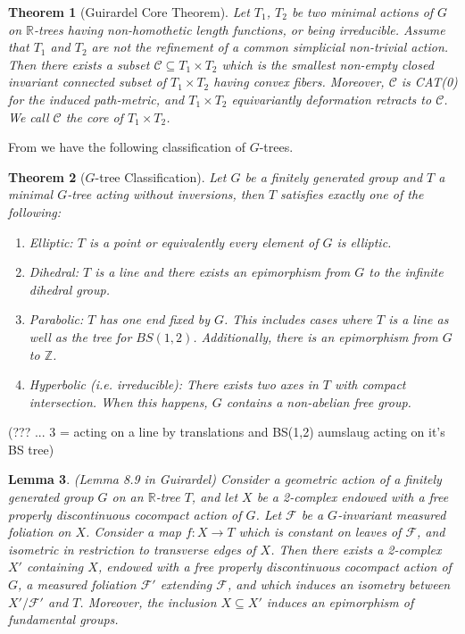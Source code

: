 \documentclass[12pt,parskip=full]{report}
\theoremstyle{plain}
\newtheorem{thm}{Theorem}[section]
\newtheorem{lem}[thm]{Lemma}
\theoremstyle{definition}
\begin{document}
\begin{thm}
    [Guirardel Core Theorem]
    \label{thm:guirardelcore}
    Let \(T_1\), \(T_2\) be two minimal actions of \(G\) on \(\mathbb{R}\)-trees having non-homothetic length functions, or being irreducible. Assume that \(T_1\) and \(T_2\) are not the refinement of a common simplicial non-trivial action. Then there exists a subset \(\mathscr{C}\subseteq T_1\times T_2\) which is the smallest non-empty closed invariant connected subset of \(T_1\times T_2\) having convex fibers. Moreover, \(\mathscr{C}\) is CAT(0) for the induced path-metric, and \(T_1\times T_2\) equivariantly deformation retracts to \(\mathscr{C}\). We call \(\mathscr{C}\) the core of \(T_1\times T_2\).
\end{thm}

From \cite{boundingcomplexity} we have the following classification of \(G\)-trees.
\begin{thm}
    [\(G\)-tree Classification]
    \label{thm:classification}
    Let \(G\) be a finitely generated group and \(T\) a minimal \(G\)-tree acting without inversions, then \(T\) satisfies exactly one of the following:
    
    \begin{enumerate}
        \item Elliptic: \(T\) is a point or equivalently every element of \(G\) is elliptic.
        \item Dihedral: \(T\) is a line and there exists an epimorphism from \(G\) to the infinite dihedral group.
        \item Parabolic: \(T\) has one end fixed by \(G\). This includes cases where \(T\) is a line as well as the tree for \(BS(1,2)\). Additionally, there is an epimorphism from \(G\) to \(\mathbb{Z}\).
        \item Hyperbolic (i.e. irreducible): There exists two axes in \(T\) with compact intersection. When this happens, \(G\) contains a non-abelian free group.
    \end{enumerate}
\end{thm}

(??? ... 3 = acting on a line by translations and BS(1,2) aumslaug acting on it's BS tree)

\begin{lem}
    \label{lem:guirardel-extension}
    (Lemma 8.9 in Guirardel)
    Consider a geometric action of a finitely generated group \(G\) on an \(\mathbb{R}\)-tree \(T\), and let \(X\) be a 2-complex endowed with a free properly discontinuous cocompact action of \(G\). Let \(\mathscr{F}\) be a \(G\)-invariant measured foliation on \(X\). Consider a map \(f: X \to T\) which is constant on leaves of \(\mathscr{F}\), and isometric in restriction to transverse edges of \(X\). Then there exists a 2-complex \( X'\) containing \(X\), endowed with a free properly discontinuous cocompact action of \(G\), a measured foliation \(\mathscr{F} '\) extending \(\mathscr{F}\), and which induces an isometry between \(X'/ \mathscr{F}'\) and \(T\). Moreover, the inclusion \(X \subseteq X'\) induces an epimorphism of fundamental groups.
\end{lem}
\end{document}
